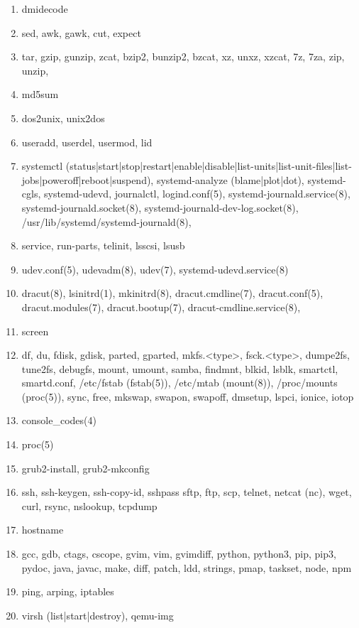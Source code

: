\documentclass{article}
\begin{document}
\begin{enumerate}
\begin{enumerate}
            \item dmidecode
            \item sed, awk, gawk, cut, expect
            \item tar, gzip, gunzip, zcat, bzip2, bunzip2, bzcat, xz, unxz, xzcat, 7z, 7za, zip, unzip,
            \item md5sum
            \item dos2unix, unix2dos
            \item useradd, userdel, usermod, lid
            \item systemctl (status|start|stop|restart|enable|disable|list-units|list-unit-files|list-jobs|poweroff|reboot|suspend), systemd-analyze (blame|plot|dot), systemd-cgls, systemd-udevd, journalctl, logind.conf(5), systemd-journald.service(8), systemd-journald.socket(8), systemd-journald-dev-log.socket(8), /usr/lib/systemd/systemd-journald(8),
            \item service, run-parts, telinit, lsscsi, lsusb
            \item udev.conf(5), udevadm(8), udev(7), systemd-udevd.service(8)
            \item dracut(8), lsinitrd(1), mkinitrd(8), dracut.cmdline(7), dracut.conf(5), dracut.modules(7), dracut.bootup(7), dracut-cmdline.service(8),
            \item screen
            \item df, du, fdisk, gdisk, parted, gparted, mkfs.<type>, fsck.<type>, dumpe2fs, tune2fs, debugfs, mount, umount, samba, findmnt, blkid, lsblk, smartctl, smartd.conf, /etc/fstab (fstab(5)), /etc/mtab (mount(8)), /proc/mounts (proc(5)), sync, free, mkswap, swapon, swapoff, dmsetup, lspci, ionice, iotop
            \item console_codes(4)
            \item proc(5)
            \item grub2-install, grub2-mkconfig
            \item ssh, ssh-keygen, ssh-copy-id, sshpass sftp, ftp, scp, telnet, netcat (nc), wget, curl, rsync, nslookup, tcpdump
            \item hostname
            \item gcc, gdb, ctags, cscope, gvim, vim, gvimdiff, python, python3, pip, pip3, pydoc, java, javac, make, diff, patch, ldd, strings, pmap, taskset, node, npm
            \item ping, arping, iptables
            \item virsh (list|start|destroy), qemu-img

\end{enumerate}
\end{enumerate}
\end{document}
